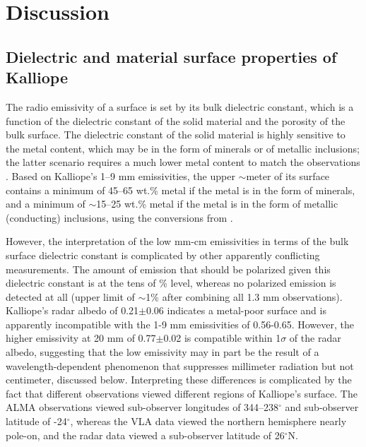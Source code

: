 \documentclass[]{aastex631}
\begin{document}
\section{Discussion} \label{sec:disc}

\subsection{Dielectric and material surface properties of Kalliope}

The radio emissivity of a surface is set by its bulk dielectric constant, which is a function of the dielectric constant of the solid material and the porosity of the bulk surface. The dielectric constant of the solid material is highly sensitive to the metal content, which may be in the form of minerals or of metallic inclusions; the latter scenario requires a much lower metal content to match the observations \citep{dekleer2021}. Based on Kalliope's 1--9 mm emissivities, the upper $\sim$meter of its surface contains a minimum of 45--65 wt.\% metal if the metal is in the form of minerals, and a minimum of $\sim$15--25 wt.\% metal if the metal is in the form of metallic (conducting) inclusions, using the conversions from \cite{dekleer2021}. 

However, the interpretation of the low mm-cm emissivities in terms of the bulk surface dielectric constant is complicated by other apparently conflicting measurements. The amount of emission that should be polarized given this dielectric constant is at the tens of \% level, whereas no polarized emission is detected at all (upper limit of $\sim$1\% after combining all 1.3 mm observations). Kalliope's radar albedo of 0.21$\pm$0.06 \citep[at $\lambda=$12.6 cm and after correcting to its updated size;][]{shepard2015,2007IcarMagri} indicates a metal-poor surface and is apparently incompatible with the 1-9 mm emissivities of 0.56-0.65. However, the higher emissivity at 20 mm of 0.77$\pm$0.02 is compatible within 1$\sigma$ of the radar albedo, suggesting that the low emissivity may in part be the result of a wavelength-dependent phenomenon that suppresses millimeter radiation but not centimeter, discussed below. Interpreting these differences is complicated by the fact that different observations viewed different regions of Kalliope's surface. The ALMA observations viewed sub-observer longitudes of 344--238$^{\circ}$ and sub-observer latitude of -24$^{\circ}$, whereas the VLA data viewed the northern hemisphere nearly pole-on, and the radar data viewed a sub-observer latitude of 26$^{\circ}$N. 
\end{document}
